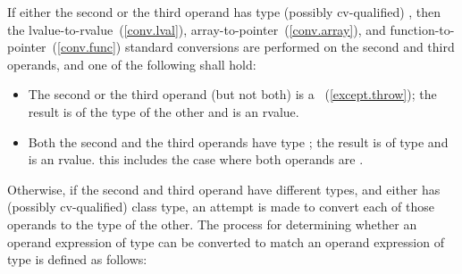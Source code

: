 \pnum
If either the second or the third operand has type (possibly cv-qualified)
, then the lvalue-to-rvalue~(\ref{conv.lval}),
array-to-pointer~(\ref{conv.array}), and
function-to-pointer~(\ref{conv.func}) standard conversions are performed
on the second and third operands, and one of the following shall hold:

\begin{itemize}
%
\item The second or the third operand (but not both) is a
~(\ref{except.throw}); the result is of the
type of the other and is an rvalue.

\item Both the second and the third operands have type ; the
result is of type  and is an rvalue. \enternote this
includes the case where both operands are .
\exitnote
\end{itemize}

\pnum
Otherwise, if the second and third operand have different types, and
either has (possibly cv-qualified) class type, an attempt is made to
convert each of those operands to the type of the other. The process for
determining whether an operand expression  of type 
can be converted to match an operand expression  of type
 is defined as follows:

